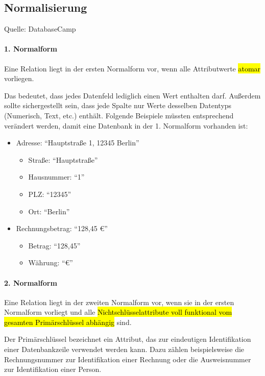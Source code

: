 \subsection{Normalisierung}
\label{sec:Normalisierung}

Quelle: DatabaseCamp \cite{normalisierung}

\paragraph{1. Normalform} Eine Relation liegt in der ersten Normalform vor, wenn alle Attributwerte \hl{atomar} vorliegen.

Das bedeutet, dass jedes Datenfeld lediglich einen Wert enthalten darf. Außerdem sollte sichergestellt sein, dass jede Spalte nur Werte desselben Datentyps (Numerisch, Text, etc.) enthält. Folgende Beispiele müssten entsprechend verändert werden, damit eine Datenbank in der 1. Normalform vorhanden ist:

\begin{multicols}{2}
	\begin{itemize}
		\item Adresse: “Hauptstraße 1, 12345 Berlin” 
		\begin{itemize}
			\item Straße: “Hauptstraße” 
			\item Hausnummer: “1”
			\item PLZ: “12345”
			\item Ort: “Berlin”
		\end{itemize}
		\columnbreak
		\item Rechnungsbetrag: “128,45 €”
		\begin{itemize}
			\item Betrag: “128,45”
			\item Währung: “€”
			\vfill
		\end{itemize}
	\end{itemize}
\end{multicols}

\paragraph{2. Normalform} Eine Relation liegt in der zweiten Normalform vor, wenn sie in der ersten Normalform vorliegt und alle \hl{Nichtschlüsselattribute voll funktional vom gesamten Primärschlüssel abhängig} sind.

Der Primärschlüssel bezeichnet ein Attribut, das zur eindeutigen Identifikation einer Datenbankzeile verwendet werden kann. Dazu zählen beispielsweise die Rechnungsnummer zur Identifikation einer Rechnung oder die Ausweisnummer zur Identifikation einer Person.

